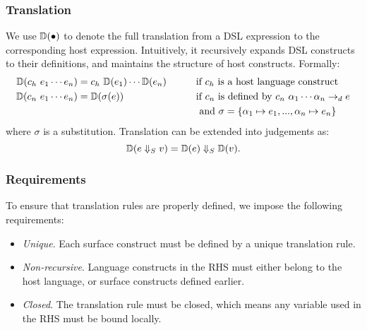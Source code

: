 

\subsubsection{Translation}

We use $\mathbb{D}(\bullet)$ to denote the full translation from a DSL expression to the corresponding host expression. 
Intuitively, it recursively expands DSL constructs to their definitions, and maintains the structure of host constructs.
Formally:
\begin{align*}
    \mathbb{D}(c_h~e_1\cdots e_n) & = c_h~\mathbb{D}(e_1)\cdots \mathbb{D}(e_n) \qquad
     & & \text{if $c_h$ is a host language construct} \\
    \mathbb{D}(c_n~e_1\cdots e_n) & = \mathbb{D}(\sigma(e)) \qquad
     & & \text{if $c_n$ is defined by $c_n~\alpha_1\cdots \alpha_n ->_d e$} \\
     & & & ~\text{and $\sigma=\{\alpha_1\mapsto e_1, ..., \alpha_n\mapsto e_n\}$} 
\end{align*}
where $\sigma$ is a substitution. 
Translation can be extended into judgements as:
\[ \mathbb{D}(e \Downarrow_S v) = \mathbb{D}(e) \Downarrow_S \mathbb{D}(v). \]

\subsubsection{Requirements}

To ensure that translation rules are properly defined, we impose the following requirements:
\begin{itemize}
    \item \textit{Unique}. Each surface construct must be defined by a unique translation rule.
    \item \textit{Non-recursive}. Language constructs in the RHS must either belong to the host language, or surface constructs defined earlier.
    \item \textit{Closed}. The translation rule must be closed, which means any variable used in the RHS must be bound locally.
\end{itemize}

